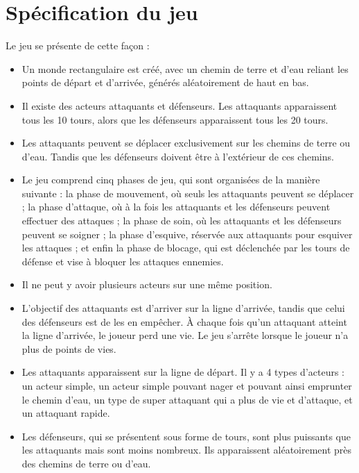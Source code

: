 \documentclass{article}
\begin{document}
\section{Spécification du jeu}
\noindent Le jeu se présente de cette façon :\\
\begin{itemize}
    \item Un monde rectangulaire est créé, avec un chemin de terre et d'eau reliant les points de départ et d'arrivée, générés aléatoirement de haut en bas.\\
    \item Il existe des acteurs attaquants et défenseurs. Les attaquants apparaissent tous les 10 tours, alors que les défenseurs apparaissent tous les 20 tours.\\
    \item Les attaquants peuvent se déplacer exclusivement sur les chemins de terre ou d'eau. Tandis que les défenseurs doivent être à l'extérieur de ces chemins.\\
    \item Le jeu comprend cinq phases de jeu, qui sont organisées de la manière suivante : la phase de mouvement, où seuls les attaquants peuvent se déplacer ; la phase d'attaque, où à la fois les attaquants et les défenseurs peuvent effectuer des attaques ; la phase de soin, où les attaquants et les défenseurs peuvent se soigner ; la phase d'esquive, réservée aux attaquants pour esquiver les attaques ; et enfin la phase de blocage, qui est déclenchée par les tours de défense et vise à bloquer les attaques ennemies.\\ 
    \item Il ne peut y avoir plusieurs acteurs sur une même position.\\
    \item L'objectif des attaquants est d'arriver sur la ligne d'arrivée, tandis que celui des défenseurs est de les en empêcher. À chaque fois qu'un attaquant atteint la ligne d'arrivée, le joueur perd une vie. Le jeu s'arrête lorsque le joueur n'a plus de points de vies.\\
    \item Les attaquants apparaissent sur la ligne de départ. Il y a 4 types d'acteurs : un acteur simple, un acteur simple pouvant nager et pouvant ainsi emprunter le chemin d'eau, un type de super attaquant qui a plus de vie et d'attaque, et un attaquant rapide.\\
    \item Les défenseurs, qui se présentent sous forme de tours, sont plus puissants que les attaquants mais sont moins nombreux. Ils apparaissent aléatoirement près des chemins de terre ou d'eau.
\end{itemize}
\end{document}
